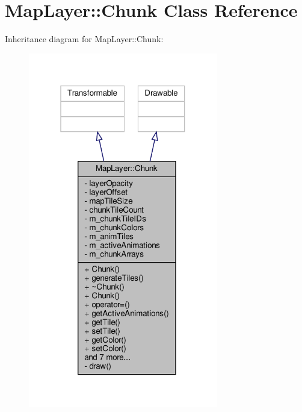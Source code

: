 \hypertarget{classMapLayer_1_1Chunk}{}\section{Map\+Layer\+:\+:Chunk Class Reference}
\label{classMapLayer_1_1Chunk}


Inheritance diagram for Map\+Layer\+:\+:Chunk\+:
\nopagebreak
\begin{figure}[H]
\begin{center}
\leavevmode
\includegraphics[width=235pt]{classMapLayer_1_1Chunk__inherit__graph}
\end{center}
\end{figure}


